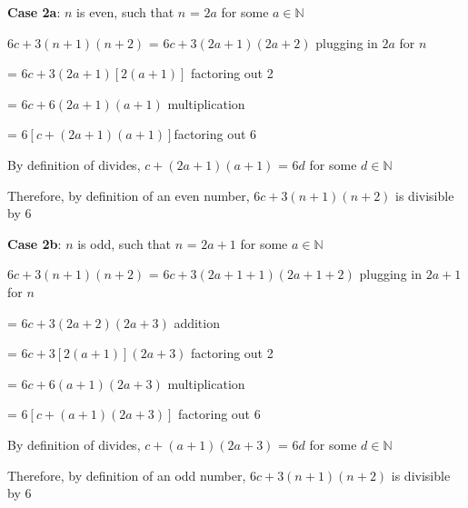\documentclass{article} %
\begin{document}
    \tabto*{2cm} \textbf{Case 2a}: $n$ is even, such that $n$ = $2a$ for some $a \in \mathbb{N}$
    \vspace*{0.08cm}

    \tabto*{2cm} $6c + 3(n+1)(n+2)$ = $6c + 3(2a + 1)(2a + 2)$ \tabto*{9.5cm}plugging in $2a$ for $n$
    \vspace*{0.08cm}

    \tabto*{5.24cm} = $6c + 3(2a + 1)[2(a + 1)]$ \tabto*{9.5cm}factoring out 2
    \vspace*{0.08cm}

    \tabto*{5.24cm} = $6c + 6(2a + 1)(a + 1)$ \tabto*{9.5cm}multiplication
    \vspace*{0.08cm}
    
    \tabto*{5.24cm} = $6[c + (2a + 1)(a + 1)]$\tabto*{9.5cm}factoring out 6
    \vspace*{0.08cm}

    \tabto*{2cm} By definition of divides, $c + (2a + 1)(a + 1)$ = $6d$ for some $d \in \mathbb{N}$

    \tabto*{2cm} Therefore, by definition of an even number, $6c + 3(n+1)(n+2)$ is divisible by 6
    \vspace*{0.3cm}

    \tabto*{2cm} \textbf{Case 2b}: $n$ is odd, such that $n$ = $2a + 1$ for some $a \in \mathbb{N}$
    \vspace*{0.08cm}

    \tabto*{2cm} $6c + 3(n+1)(n+2)$ = $6c + 3(2a+1 + 1)(2a+1 + 2)$ \tabto*{10.4cm}plugging in $2a+1$ for $n$
    \vspace*{0.08cm}

    \tabto*{5.24cm} = $6c + 3(2a+2)(2a+3)$ \tabto*{10.4cm}addition
    \vspace*{0.08cm}

    \tabto*{5.24cm} = $6c + 3[2(a+1)](2a+3)$ \tabto*{10.4cm}factoring out 2
    \vspace*{0.08cm}

    \tabto*{5.24cm} = $6c + 6(a+1)(2a+3)$ \tabto*{10.4cm}multiplication
    \vspace*{0.08cm}

    \tabto*{5.24cm} = $6[c + (a+1)(2a+3)]$ \tabto*{10.4cm}factoring out 6
    \vspace*{0.08cm}

    \tabto*{2cm} By definition of divides, $c + (a + 1)(2a + 3)$ = $6d$ for some $d \in \mathbb{N}$

    \tabto*{2cm} Therefore, by definition of an odd number, $6c + 3(n+1)(n+2)$ is divisible by 6
\end{document}
